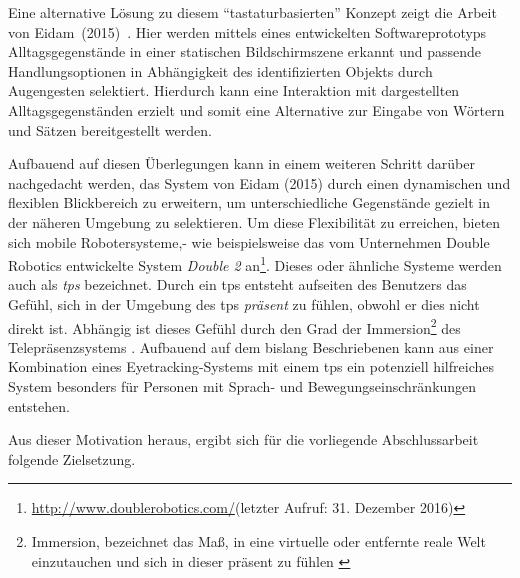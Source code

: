 Eine alternative Lösung zu diesem \enquote{tastaturbasierten} Konzept zeigt die Arbeit von Eidam~(2015)~\cite{Eidam2015}. Hier werden mittels eines entwickelten Softwareprototyps Alltagsgegenstände in einer statischen Bildschirmszene erkannt und passende Handlungsoptionen in Abhängigkeit des identifizierten Objekts durch Augengesten selektiert. Hierdurch kann eine Interaktion mit dargestellten Alltagsgegenständen erzielt und somit eine Alternative zur Eingabe von Wörtern und Sätzen bereitgestellt werden. 

Aufbauend auf diesen Überlegungen kann in einem weiteren Schritt darüber nachgedacht werden, das System von Eidam (2015) durch einen dynamischen und flexiblen Blickbereich zu erweitern, um unterschiedliche Gegenstände gezielt in der näheren Umgebung zu selektieren. Um diese Flexibilität zu erreichen, bieten sich mobile Robotersysteme,- wie beispielsweise das vom Unternehmen Double Robotics entwickelte System \textit{Double 2} an\footnote{\url{http://www.doublerobotics.com/}(letzter Aufruf: 31. Dezember 2016)}. Dieses oder ähnliche Systeme werden auch als \textit{\acf{tps}} bezeichnet. Durch ein \acl{tps} entsteht aufseiten des Benutzers das Gefühl, sich in der Umgebung des \acs{tps} \textit{präsent} zu fühlen, obwohl er dies nicht direkt ist. Abhängig ist dieses Gefühl durch den Grad der Immersion\footnote{Immersion, bezeichnet das Maß, in eine virtuelle oder entfernte reale Welt einzutauchen und sich in dieser präsent zu fühlen \cite{Rossler2009}} des Telepräsenzsystems \cite{Rossler2009}. Aufbauend auf dem bislang Beschriebenen kann aus einer Kombination eines Eyetracking-Systems mit einem \acs{tps} ein potenziell hilfreiches System besonders für Personen mit Sprach- und Bewegungseinschränkungen entstehen. 

Aus dieser Motivation heraus, ergibt sich für die vorliegende Abschlussarbeit folgende Zielsetzung.

